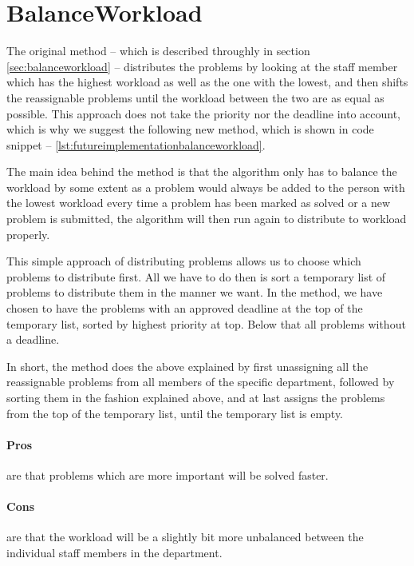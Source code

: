 \section{BalanceWorkload}
\label{sec:futureimplementationbalanceworkload}

The original  method -- which is described throughly in section \ref{sec:balanceworkload} -- distributes the problems by looking at the staff member which has the highest workload as well as the one with the lowest, and then shifts the reassignable problems until the workload between the two are as equal as possible. This approach does not take the priority nor the deadline into account, which is why we suggest the following new method, which is shown in code snippet -- \ref{lst:futureimplementationbalanceworkload}. 

The main idea behind the  method is that the algorithm only has to balance the workload by some extent as a problem would always be added to the person with the lowest workload every time a problem has been marked as solved or a new problem is submitted, the algorithm will then run again to distribute to workload properly.

This simple approach of distributing problems allows us to choose which problems to distribute first. All we have to do then is sort a temporary list of problems to distribute them in the manner we want. In the  method, we have chosen to have the problems with an approved deadline at the top of the temporary list, sorted by highest priority at top. Below that all problems without a deadline.

In short, the  method does the above explained by first unassigning all the reassignable problems from all members of the specific department, followed by sorting them in the fashion explained above, and at last assigns the problems from the top of the temporary list, until the temporary list is empty.

\paragraph{Pros} are that problems which are more important will be solved faster.
\paragraph{Cons} are that the workload will be a slightly bit more unbalanced between the individual staff members in the department.
